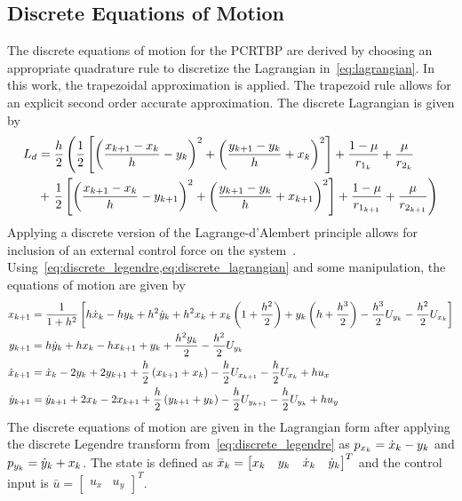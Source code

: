 \documentclass[letterpaper, preprint, paper,11pt]{AAS}	%
\begin{document}
\subsection{Discrete Equations of Motion}
The discrete equations of motion for the PCRTBP are derived by choosing an appropriate quadrature rule to discretize the Lagrangian in~\cref{eq:lagrangian}. 
In this work, the trapezoidal approximation is applied.
The trapezoid rule allows for an explicit second order accurate approximation.
The discrete Lagrangian is given by
\begin{align}\label{eq:discrete_lagrangian}
	L_d &= \frac{h}{2} \left( \frac{1}{2} \bracket{\left(  \frac{\xkp - \xk}{h} -\yk \right)^2 + \left( \frac{\ykp - \yk}{h} + \xk \right)^2} + \frac{1 - \mu}{r_{1_k}} + \frac{\mu}{r_{2_k}} \right. \nonumber \\ 
	&+ \left. \frac{1}{2} \bracket{\left(  \frac{\xkp - \xk}{h} -\ykp \right)^2 + \left( \frac{\ykp - \yk}{h} + \xkp \right)^2} + \frac{1-\mu}{r_{1_{k+1}}} + \frac{\mu}{r_{2_{k+1}}}  \right)
\end{align}
Applying a discrete version of the Lagrange-d'Alembert principle allows for inclusion of an external control force on the system~\cite{marsden2001}.
Using~\cref{eq:discrete_legendre,eq:discrete_lagrangian} and some manipulation, the equations of motion are given by
\begin{subequations}\label{eq:discrete_eoms}
\begin{align}
	\xkp &= \frac{1}{1+ h^2} \bracket{h \dot{x}_k - h \yk + h^2 \dot{y}_k + h^2 \xk + \xk \parenth{1+ \frac{h^2}{2}} + \yk \parenth{h + \frac{h^3}{2}} - \frac{h^3}{2} U_{y_k} - \frac{h^2}{2} U_{x_k} } \label{eq:xkp}\\
	\ykp &= h \dot{y}_k + h \xk - h \xkp + \yk + \frac{h^2 \yk}{2} - \frac{h^2 }{2} U_{y_k} \label{eq:ykp}\\
	\dot{x}_{k+1} &= \dot{x}_k - 2 \yk + 2 \ykp + \frac{h}{2} \parenth{\xkp + \xk} - \frac{h}{2} U_{\xkp} - \frac{h}{2} U_{\xk} + h u_x \label{eq:xdotkp}\\
	\dot{y}_{k+1} &= \dot{y}_{k+1} + 2 \xk - 2 \xkp + \frac{h}{2} \parenth{\ykp + \yk} - \frac{h}{2} U_{\ykp} - \frac{h}{2} U_{\yk} + h u_y \label{eq:ydotkp}
\end{align}
\end{subequations}
The discrete equations of motion are given in the Lagrangian form after applying the discrete Legendre transform from~\cref{eq:discrete_legendre} as \( p_{x_k} = \dot{x}_k - y_{k} \) and \( p_{y_{k}} = \dot{y}_k + x_k \).
The state is defined as \( \bar{ x}_k = \begin{bmatrix} x_k & y_{k} & \dot{x}_k & \dot{y}_k \end{bmatrix}^T\) and the control input is \( \bar{u} = \begin{bmatrix} u_x & u_y \end{bmatrix}^T \).
\end{document}
